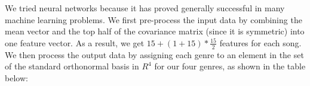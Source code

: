 We tried neural networks because it has proved generally successful in many machine learning problems.
We first pre-process the input data by combining the mean vector and the top half of the covariance matrix (since it is symmetric) into one feature vector. 
As a result, we get $15 + (1+15)*\frac{15}{2}$ features for each song. 
We then process the output data by assigning each genre to an element in the set of the standard orthonormal basis in $R^4$ for our four genres, as shown in the table below:

